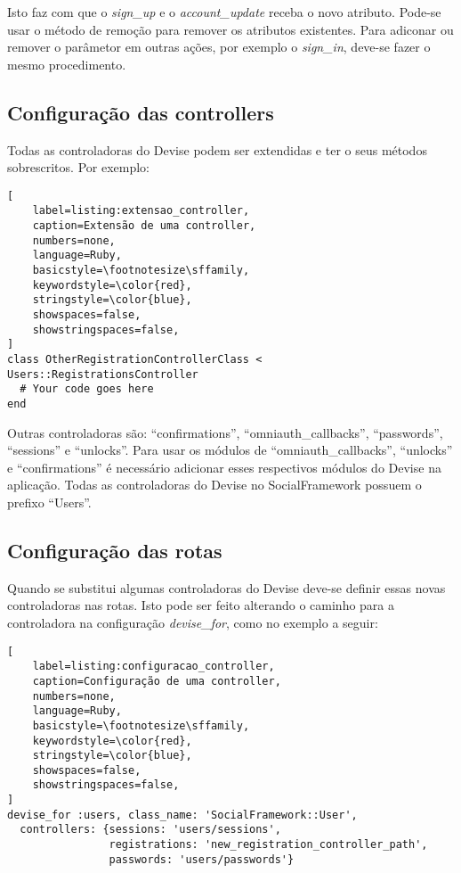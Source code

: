 Isto faz com que o \textit{sign\_up} e o \textit{account\_update} receba o novo atributo. Pode-se usar o método de remoção para remover os atributos existentes. Para adiconar ou remover o parâmetor em outras ações, por exemplo o \textit{sign\_in}, deve-se fazer o mesmo procedimento.

\subsection{Configuração das controllers}

Todas as controladoras do Devise podem ser extendidas e ter o seus métodos sobrescritos. Por exemplo:

\begin{lstlisting}[
    label=listing:extensao_controller,
    caption=Extensão de uma controller,
    numbers=none,
    language=Ruby,
    basicstyle=\footnotesize\sffamily,
    keywordstyle=\color{red},
    stringstyle=\color{blue},
    showspaces=false,
    showstringspaces=false,
]
class OtherRegistrationControllerClass < Users::RegistrationsController
  # Your code goes here
end
\end{lstlisting}

Outras controladoras são: ``confirmations'', ``omniauth\_callbacks'', ``passwords'', ``sessions'' e ``unlocks''. Para usar os módulos de ``omniauth\_callbacks'', ``unlocks'' e ``confirmations'' é necessário adicionar esses respectivos módulos do Devise na aplicação. Todas as controladoras do Devise no SocialFramework possuem o prefixo ``Users''.

\subsection{Configuração das rotas}

Quando se substitui algumas controladoras do Devise deve-se definir essas novas controladoras nas rotas. Isto pode ser feito alterando o caminho para a controladora na configuração \textit{devise\_for}, como no exemplo a seguir:

\begin{lstlisting}[
    label=listing:configuracao_controller,
    caption=Configuração de uma controller,
    numbers=none,
    language=Ruby,
    basicstyle=\footnotesize\sffamily,
    keywordstyle=\color{red},
    stringstyle=\color{blue},
    showspaces=false,
    showstringspaces=false,
]
devise_for :users, class_name: 'SocialFramework::User',
  controllers: {sessions: 'users/sessions',
                registrations: 'new_registration_controller_path',
                passwords: 'users/passwords'}
\end{lstlisting}

